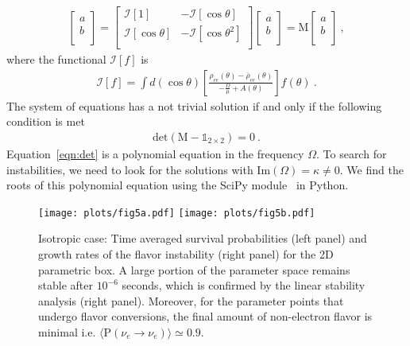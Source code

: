 \documentclass[aps, prd, 10pt, twocolumn, superscriptaddress, noshowpacs, preprintnumbers, longbibliography, groupedaddress, footinbib, bibnotes]{revtex4-1}
\begin{document}
\begin{eqnarray}\label{eq:system}
\begin{bmatrix}
a \\
b \\
\end{bmatrix}
=
\begin{bmatrix}
\mathcal{I}[1] & - \mathcal{I}[\cos{\theta}]  \\
\mathcal{I}[\cos{\theta}] & - \mathcal{I}[\cos{\theta}^2]  \\
\end{bmatrix}
\begin{bmatrix}
a \\
b \\
\end{bmatrix}
=
\mathrm{M}
\begin{bmatrix}
a \\
b \\
\end{bmatrix} \ ,
\end{eqnarray}
where the functional $\mathcal{I}[f]$ is
\begin{eqnarray}
 \mathcal{I}[f] = \int d(\cos{\theta}) \left[\frac{\rho_{ee}(\theta)-\bar{\rho}_{ee}(\theta)}{-\frac{\Omega}{\mu} + A(\theta)}\right] f(\theta)\ .
\end{eqnarray}
The system of equations has a not trivial solution if and only if the following condition is met
\begin{eqnarray}\label{eqn:det}
 \mathrm{det}( \mathrm{M} - \mathds{1}_{2\times2} ) = 0\ . 
\end{eqnarray}
Equation~\ref{eqn:det} is a polynomial equation in the frequency $\Omega$. To search for instabilities, we need to look for the solutions with $\mathrm{Im}(\Omega) = \kappa \neq 0$. We find the roots of this polynomial equation using the SciPy module~\cite{SciPy} in Python.

\begin{figure*}[t!]
\centering
\texttt{[image: plots/fig5a.pdf]}\hspace{1.0cm}  
\texttt{[image: plots/fig5b.pdf]}
\caption{ 
Isotropic case: Time averaged survival probabilities (left panel) and growth rates of the flavor instability (right panel) for the 2D parametric box. A large portion of the parameter space remains stable after $10^{-6}$ seconds, which is confirmed by the linear stability analysis (right panel). Moreover, for the parameter points that undergo flavor conversions, the final amount of non-electron flavor is minimal i.e. $\langle \mathrm{P}(\nu_e \rightarrow \nu_e) \rangle  \simeq 0.9$.
}
 \label{fig:5pr}
\end{figure*} 
\end{document}
